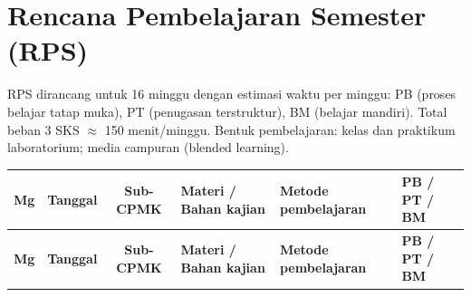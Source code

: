 \documentclass[12pt,a4paper]{article}
\begin{document}
\section{Rencana Pembelajaran Semester (RPS)}

RPS dirancang untuk 16 minggu dengan estimasi waktu per minggu: PB (proses belajar tatap muka), PT (penugasan terstruktur), BM (belajar mandiri). Total beban 3 SKS $\approx$ 150 menit/minggu. Bentuk pembelajaran: kelas dan praktikum laboratorium; media campuran (blended learning).

\begin{longtable}{|c|c|c|>{\raggedright\arraybackslash}p{2.4cm}|>{\raggedright\arraybackslash}p{2.5cm}|>{\raggedright\arraybackslash}p{2.1cm}|}
\hline
\textbf{Mg} & \textbf{Tanggal} & \textbf{Sub-CPMK} & \textbf{Materi / Bahan kajian} & \textbf{Metode pembelajaran} & \textbf{PB / PT / BM} \\
\hline
\endfirsthead

\hline
\textbf{Mg} & \textbf{Tanggal} & \textbf{Sub-CPMK} & \textbf{Materi / Bahan kajian} & \textbf{Metode pembelajaran} & \textbf{PB / PT / BM} \\
\hline
\endhead


\end{longtable}
\end{document}
